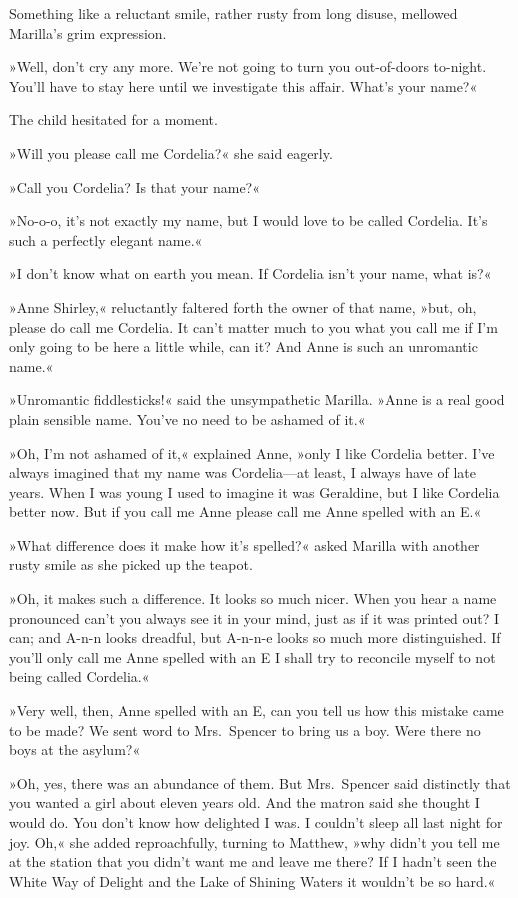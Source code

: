 Something like a reluctant smile, rather rusty from long disuse, mellowed Marilla's grim expression.

»Well, don't cry any more. We're not going to turn you out-of-doors to-night. You'll have to stay here until we investigate this affair. What's your name?«

The child hesitated for a moment.

»Will you please call me Cordelia?« she said eagerly.

»Call you Cordelia? Is that your name?«

»No-o-o, it's not exactly my name, but I would love to be called Cordelia. It's such a perfectly elegant name.«

»I don't know what on earth you mean. If Cordelia isn't your name, what is?«

»Anne Shirley,« reluctantly faltered forth the owner of that name, »but, oh, please do call me Cordelia. It can't matter much to you what you call me if I'm only going to be here a little while, can it? And Anne is such an unromantic name.«

»Unromantic fiddlesticks!« said the unsympathetic Marilla. »Anne is a real good plain sensible name. You've no need to be ashamed of it.«

»Oh, I'm not ashamed of it,« explained Anne, »only I like Cordelia better. I've always imagined that my name was Cordelia—at least, I always have of late years. When I was young I used to imagine it was Geraldine, but I like Cordelia better now. But if you call me Anne please call me Anne spelled with an E.«

»What difference does it make how it's spelled?« asked Marilla with another rusty smile as she picked up the teapot.

»Oh, it makes such a difference. It looks so much nicer. When you hear a name pronounced can't you always see it in your mind, just as if it was printed out? I can; and A-n-n looks dreadful, but A-n-n-e looks so much more distinguished. If you'll only call me Anne spelled with an E I shall try to reconcile myself to not being called Cordelia.«

»Very well, then, Anne spelled with an E, can you tell us how this mistake came to be made? We sent word to Mrs.~Spencer to bring us a boy. Were there no boys at the asylum?«

»Oh, yes, there was an abundance of them. But Mrs.~Spencer said distinctly that you wanted a girl about eleven years old. And the matron said she thought I would do. You don't know how delighted I was. I couldn't sleep all last night for joy. Oh,« she added reproachfully, turning to Matthew, »why didn't you tell me at the station that you didn't want me and leave me there? If I hadn't seen the White Way of Delight and the Lake of Shining Waters it wouldn't be so hard.«

